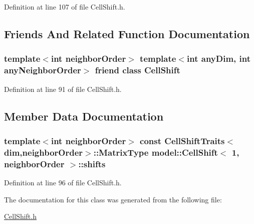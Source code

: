 Definition at line 107 of file Cell\+Shift.\+h.



\subsection{Friends And Related Function Documentation}
\hypertarget{classmodel_1_1_cell_shift_3_011_00_01neighbor_order_01_4_a710c956f234de98c0962a73bf402c186}{}
\subsubsection[{Cell\+Shift}]{\setlength{\rightskip}{0pt plus 5cm}template$<$int neighbor\+Order$>$ template$<$int any\+Dim, int any\+Neighbor\+Order$>$ friend class {\bf Cell\+Shift}\hspace{0.3cm}{\ttfamily [friend]}}\label{classmodel_1_1_cell_shift_3_011_00_01neighbor_order_01_4_a710c956f234de98c0962a73bf402c186}


Definition at line 91 of file Cell\+Shift.\+h.



\subsection{Member Data Documentation}
\hypertarget{classmodel_1_1_cell_shift_3_011_00_01neighbor_order_01_4_a2337ec3815b7a5bb83d6c6d15720766a}{}
\subsubsection[{shifts}]{\setlength{\rightskip}{0pt plus 5cm}template$<$int neighbor\+Order$>$ const {\bf Cell\+Shift\+Traits}$<${\bf dim},neighbor\+Order$>$\+::Matrix\+Type {\bf model\+::\+Cell\+Shift}$<$ 1, neighbor\+Order $>$\+::shifts\hspace{0.3cm}{\ttfamily [static]}}\label{classmodel_1_1_cell_shift_3_011_00_01neighbor_order_01_4_a2337ec3815b7a5bb83d6c6d15720766a}


Definition at line 96 of file Cell\+Shift.\+h.



The documentation for this class was generated from the following file\+:\begin{DoxyCompactItemize}
\item 
\hyperlink{_cell_shift_8h}{Cell\+Shift.\+h}\end{DoxyCompactItemize}
